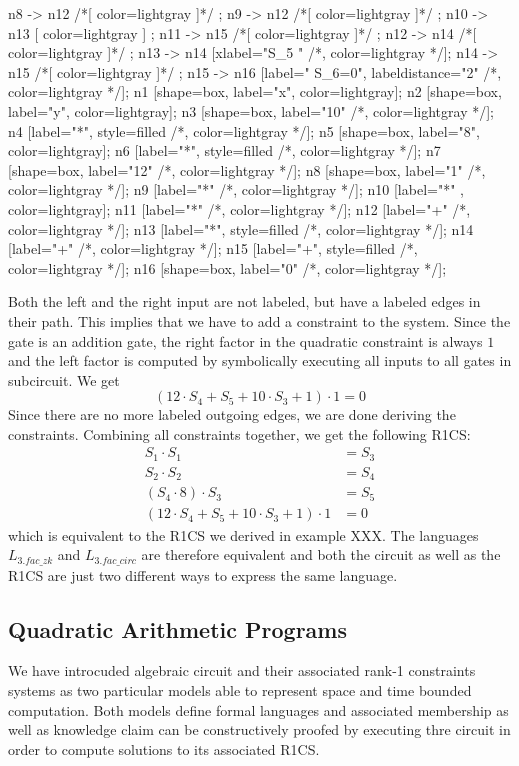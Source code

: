 \begin{example}
\begin{center}
{	n8 -> n12 /*[ color=lightgray ]*/ ;
	n9 -> n12 /*[ color=lightgray ]*/ ;
	n10 -> n13 [ color=lightgray ] ; 
	n11 -> n15 /*[ color=lightgray ]*/ ;
	n12 -> n14 /*[ color=lightgray ]*/ ;	
	n13 -> n14 [xlabel="S_5  "  /*, color=lightgray */];
	n14 -> n15 /*[ color=lightgray ]*/ ;
	n15 -> n16 [label="  S_6=0", labeldistance="2" /*, color=lightgray */];
	n1 [shape=box, label="x", color=lightgray];
	n2 [shape=box, label="y", color=lightgray];
	n3 [shape=box, label="10" /*, color=lightgray */];
	n4 [label="*", style=filled /*, color=lightgray */];
	n5 [shape=box, label="8", color=lightgray];
	n6 [label="*", style=filled /*, color=lightgray */];
	n7 [shape=box, label="12" /*, color=lightgray */];
	n8 [shape=box, label="1" /*, color=lightgray */];
	n9 [label="*" /*, color=lightgray */];
	n10 [label="*" , color=lightgray];
	n11 [label="*" /*, color=lightgray */];	
	n12 [label="+" /*, color=lightgray */];	
	n13 [label="*", style=filled /*, color=lightgray */];
	n14 [label="+" /*, color=lightgray */];
	n15 [label="+", style=filled /*, color=lightgray */];
	n16 [shape=box, label="0" /*, color=lightgray */];		
}
\end{center}
Both the left and the right input are not labeled, but have a labeled edges in their path. This implies that we have to add a constraint to the system. Since the gate is an addition gate, the right factor in the quadratic constraint is always $1$ and the left factor is computed by symbolically executing all inputs to all gates in subcircuit. We get
$$
(12\cdot S_4 + S_5 + 10\cdot S_3 + 1)\cdot 1 = 0
$$
Since there are no more labeled outgoing edges, we are done deriving the constraints. Combining all constraints together, we get the following R1CS:
\begin{align*}
 S_1 \cdot S_1 &= S_3\\
 S_2 \cdot S_2 &= S_4\\
 (S_4\cdot 8)\cdot S_3 &= S_5\\
 (12\cdot S_4 + S_5 + 10\cdot S_3 + 1)\cdot 1 &= 0
\end{align*}
which is equivalent to the R1CS we derived in example XXX. The languages $L_{3.fac\_zk}$ and $L_{3.fac\_circ}$ are therefore equivalent and both the circuit as well as the R1CS are just two different ways to express the same language.
\end{example}
\subsection{Quadratic Arithmetic Programs} We have introcuded algebraic circuit and their associated rank-1 constraints systems as two particular models able to represent space and time bounded computation. Both models define formal languages and associated membership as well as knowledge claim can be constructively proofed by executing thre circuit in order to compute solutions to its associated R1CS. 

